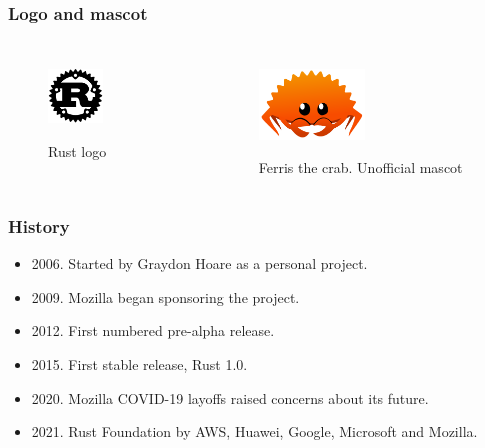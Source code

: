 \documentclass{beamer}
\begin{document}
\begin{frame}

\frametitle{Logo and mascot}

\begin{columns}[c] %


  \begin{figure}
    \centering
    \href{https://foundation.rust-lang.org/img/rust-logo-blk.svg}
      {\includegraphics[width=0.5\textwidth]{rust-logo-blk.png}}
    \caption{Rust logo}
  \end{figure}

  \begin{figure}
    \centering
    \href{https://rustacean.net/assets/rustacean-orig-noshadow.svg}
      {\includegraphics[width=0.5\textwidth]{rustacean-orig-noshadow.png}}
    \caption{Ferris the crab. Unofficial mascot}
  \end{figure}

\end{columns}

\end{frame}

\begin{frame}
\frametitle{History}

\begin{itemize}
\item 2006. Started by Graydon Hoare as a personal project.
\item 2009. Mozilla began sponsoring the project.
\item 2012. First numbered pre-alpha release.
\item 2015. First stable release, Rust 1.0.
\item 2020. Mozilla COVID-19 layoffs raised concerns about its future.
\item 2021. Rust Foundation by AWS, Huawei, Google, Microsoft and Mozilla.
\end{itemize}

\end{frame}
\end{document}
